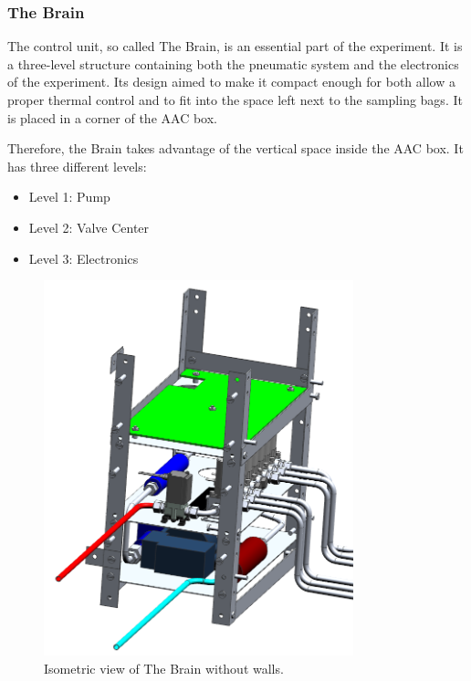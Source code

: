 \pagebreak
\subsubsection{The Brain}

The control unit, so called The Brain, is an essential part of the experiment. It is a three-level structure containing both the pneumatic system and the electronics of the experiment. Its design aimed to make it compact enough for both allow a proper thermal control and to fit into the space left next to the sampling bags. It is placed in a corner of the AAC box. 

Therefore, the Brain takes advantage of the vertical space inside the AAC box. It has three different levels: 

\begin{itemize}
    \item Level 1: Pump
    \item Level 2: Valve Center
    \item Level 3: Electronics
\end{itemize}


\begin{figure}[H]
    \centering
    \includegraphics[width=0.8\textwidth]{4-experiment-design/img/Mechanical/Brain_Isometric_Open.png}
    \caption{Isometric view of The Brain without walls.}
    \label{brain_isometric_open}
\end{figure}


